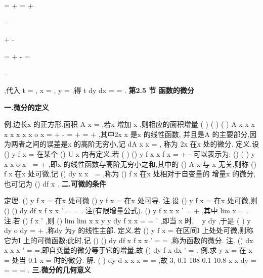 =
+
=
+



\Rightarrow 
\Rightarrow 
=


+
-


=
+
-
=

-



,代入 
t =
,
x =
,
y
\pi 
=
,得
t
dy
dx
=
=
. 
\vspace{6pt}
{\large \bfseries \textcolor{lyred}{第2.5 节 函数的微分}}

\vspace{4pt}
{\bfseries \textcolor{lyred}{一.微分的定义}}

\textcolor{lyred}{例}.边长x 的正方形,面积
A
x
=
,若x 增加
x
\Delta ,则相应的面积增量 
(
)
(
)
(
)
A
x
x
x
x x
x
x x
o
x
\Delta 
\Delta 
\Delta 
\Delta 
\Delta 
\Delta 
=
+
-
=
+
=
+
,其中2x x
\Delta 是x
\Delta 的\textcolor{lyred}{线性函数}, 
并且是A
\Delta 的\textcolor{lyred}{主要部分},因为两者之间的误差是x
\Delta 的高阶无穷小,记
dA
x x
=
\Delta , 
称为
2x 在x 处的\textcolor{lyred}{微分}. 
\textcolor{lyred}{定义}.设
()
y
f x
=
在某个
()
U x 内有定义,若
(
)
()
y
f x
x
f x
\Delta 
\Delta 
=
+
-
可以表示为: 
()
(
)
y
x
x
o
x
\Delta 

\Delta 
\Delta 
=
+
,即x
\Delta 的线性函数与高阶无穷小之和,其中的
()
A x 与
x
\Delta  
无关,则称
()
f x 在x 处\textcolor{lyred}{可微},记
()
dy
x
x

\Delta 
=
,称为
()
f x 在x 处相对于自变量的 
增量x
\Delta 的\textcolor{lyred}{微分},也可记为
()
df x . 
\vspace{4pt}
{\bfseries \textcolor{lyred}{二.可微的条件}}

\textcolor{lyred}{定理}.
()
y
f x
=
在x 处可微
()
y
f x
\Leftrightarrow 
=
在x 处可导. 
\textcolor{lyred}{注}.设
()
y
f x
=
在x 处可微,则
()
()
dy
df x
f
x
x
\Delta 
'
=
=
. 
\textcolor{lyred}{注(有限增量公式)}.
()
y
f
x
x
x
\Delta 
\Delta 
\alpha \Delta 
'
=
+
\cdots 
,其中
lim
x
\Delta 
\alpha 
\to 
=
. 
\textcolor{lyred}{注}.若
()
f
x
'
\neq 
,则
()
lim
lim
x
x
y
y
dy
f
x
x
\Delta \to 
\Delta \to 
\Delta 
\Delta 
=
=
'
\Delta 
,即当
x
\Delta \to 
时,
~
y
dy
\Delta 
,于是 
(
)
y
dy
o dy
\Delta 
=
+
,称dy 为y
\Delta 的\textcolor{lyred}{线性主部}. 
\textcolor{lyred}{定义}.若
()
y
f x
=
在区间I 上处处可微,则称它为I 上的\textcolor{lyred}{可微函数};此时,记 
()
()
dy
df x
f
x
x
\Delta 
'
=
=
,称为\textcolor{lyred}{函数的微分}. 
\textcolor{lyred}{注}.
()
dx
x
x
x
'
=
\Delta =\Delta ,即自变量的微分等于它的增量,故
()
dy
f
x dx
'
=
. 
\textcolor{lyred}{例}.求
y
x
=
在
x =
处当
0.1
x
\Delta =
时的微分. 
解.
(
)
dy
d x
x
x
\Delta 
=
=
,故
3,
0.1
108 0.1
10.8
x
x
dy
\Delta 
=
=
=
\cdots 
=
. 
\vspace{4pt}
{\bfseries \textcolor{lyred}{三.微分的几何意义}}

